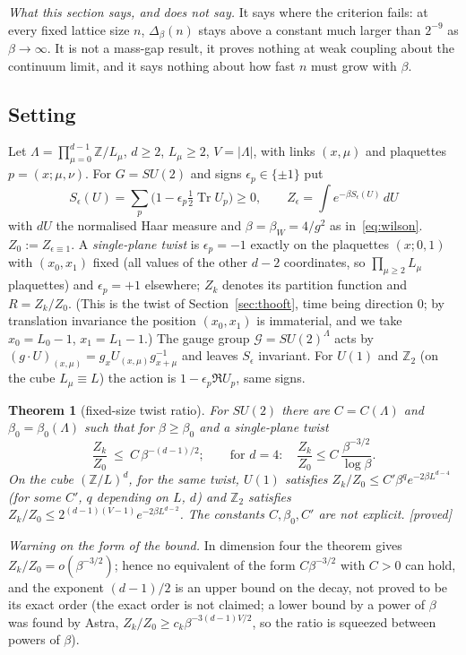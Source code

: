 \documentclass[11pt,a4paper]{article}
\theoremstyle{plain}
\newtheorem{theorem}{Theorem}[section]
\theoremstyle{definition}
\theoremstyle{remark}
\numberwithin{equation}{section}
\newcommand{\Z}{\mathbb{Z}}
\newcommand{\Tr}{\operatorname{Tr}}
\newcommand{\st}[1]{\textsf{[#1]}}
\begin{document}
\emph{What this section says, and does not say.} It says where the criterion fails: at every fixed lattice size $n$, $\Delta_\beta(n)$ stays above a constant much larger than $2^{-9}$ as $\beta\to\infty$. It is not a mass-gap result, it proves nothing at weak coupling about the continuum limit, and it says nothing about how fast $n$ must grow with $\beta$.

\subsection{Setting}
Let $\Lambda=\prod_{\mu=0}^{d-1}\Z/L_\mu$, $d\ge2$, $L_\mu\ge2$, $V=|\Lambda|$, with links $(x,\mu)$ and plaquettes $p=(x;\mu,\nu)$. For $G=SU(2)$ and signs $\epsilon_p\in\{\pm1\}$ put
\[
S_\epsilon(U)=\sum_p\bigl(1-\epsilon_p\tfrac12\Tr U_p\bigr)\ge0,\qquad Z_\epsilon=\int e^{-\beta S_\epsilon(U)}\,dU
\]
with $dU$ the normalised Haar measure and $\beta=\beta_W=4/g^2$ as in~\eqref{eq:wilson}. $Z_0:=Z_{\epsilon\equiv1}$. A \emph{single-plane twist} is $\epsilon_p=-1$ exactly on the plaquettes $(x;0,1)$ with $(x_0,x_1)$ fixed (all values of the other $d-2$ coordinates, so $\prod_{\mu\ge2}L_\mu$ plaquettes) and $\epsilon_p=+1$ elsewhere; $Z_k$ denotes its partition function and $R=Z_k/Z_0$. (This is the twist of Section~\ref{sec:thooft}, time being direction $0$; by translation invariance the position $(x_0,x_1)$ is immaterial, and we take $x_0=L_0-1$, $x_1=L_1-1$.) The gauge group $\mathcal G=SU(2)^\Lambda$ acts by $(g\cdot U)_{(x,\mu)}=g_xU_{(x,\mu)}g_{x+\mu}^{-1}$ and leaves $S_\epsilon$ invariant. For $U(1)$ and $\Z_2$ (on the cube $L_\mu\equiv L$) the action is $1-\epsilon_p\Re U_p$, same signs.

\begin{theorem}[fixed-size twist ratio]\label{thm:L}
For $SU(2)$ there are $C=C(\Lambda)$ and $\beta_0=\beta_0(\Lambda)$ such that for $\beta\ge\beta_0$ and a single-plane twist
\[
\frac{Z_k}{Z_0}\ \le\ C\,\beta^{-(d-1)/2};\qquad\text{for }d=4:\quad \frac{Z_k}{Z_0}\le C\,\frac{\beta^{-3/2}}{\log\beta}.
\]
On the cube $(\Z/L)^d$, for the same twist, $U(1)$ satisfies $Z_k/Z_0\le C'\beta^{q}e^{-2\beta L^{d-4}}$ (for some $C'$, $q$ depending on $L$, $d$) and $\Z_2$ satisfies $Z_k/Z_0\le2^{(d-1)(V-1)}e^{-2\beta L^{d-2}}$. The constants $C,\beta_0,C'$ are not explicit. \st{proved}
\end{theorem}
\emph{Warning on the form of the bound.} In dimension four the theorem gives $Z_k/Z_0=o(\beta^{-3/2})$; hence no equivalent of the form $C\beta^{-3/2}$ with $C>0$ can hold, and the exponent $(d-1)/2$ is an upper bound on the decay, not proved to be its exact order (the exact order is not claimed; a lower bound by a power of $\beta$ was found by Astra, $Z_k/Z_0\ge c_k\beta^{-3(d-1)V/2}$, so the ratio is squeezed between powers of $\beta$).
\end{document}
